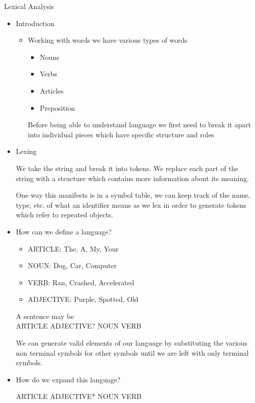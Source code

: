 \documentclass{report}
\begin{document}
\large{Lexical Analysis}
\begin{itemize}
    \item Introduction
        \begin{itemize}
            \item Working with words we have various types of words
                \begin{itemize}
                    \item Nouns
                    \item Verbs
                    \item Articles
                    \item Preposition
                \end{itemize}

                Before being able to understand language we first
                need to break it apart into individual pieces which
                have specific structure and roles
        \end{itemize}
    \item Lexing
        \begin{mdframed}
            We take the string and break it into tokens.
            We replace each part of the string with a structure
            which contains more information about its meaning.

            One way this manifests is in a symbol table, we can
            keep track of the name, type, etc. of what an identifier
            means as we lex in order to generate tokens which refer to
            repeated objects.
        \end{mdframed}
    \item How can we define a language?
        \begin{itemize}
            \item ARTICLE: The, A, My, Your
            \item NOUN: Dog, Car, Computer
            \item VERB: Ran, Crashed, Accelerated
            \item ADJECTIVE: Purple, Spotted, Old
        \end{itemize}
        A sentence may be\\
        ARTICLE ADJECTIVE? NOUN VERB

        \begin{mdframed}
            We can generate valid elements of our language by substituting
            the various non terminal symbols for other symbols until we are left
            with only terminal symbols.
        \end{mdframed}
    \item How do we expand this language?
        \begin{mdframed}
           ARTICLE ADJECTIVE* NOUN VERB 
        \end{mdframed}


\end{itemize}
\end{document}
